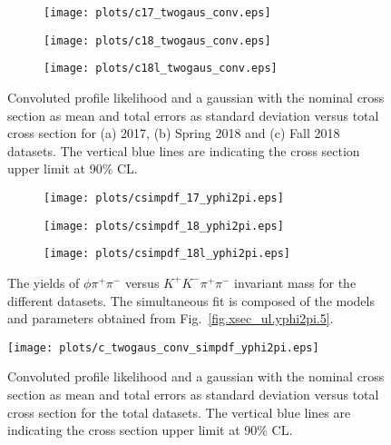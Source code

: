\begin{figure}[htbp]
    \centering
    \begin{subfigure}[b]{0.49\textwidth}
        \texttt{[image: plots/c17\_twogaus\_conv.eps]}
        \caption{}
        \label{fig.xsec_ul.yphi2pi.7.a}
    \end{subfigure}
    \begin{subfigure}[b]{0.49\textwidth}
        \texttt{[image: plots/c18\_twogaus\_conv.eps]}
        \caption{}
        \label{fig.xsec_ul.yphi2pi.7.b}
    \end{subfigure}
    \begin{subfigure}[b]{0.49\textwidth}
        \texttt{[image: plots/c18l\_twogaus\_conv.eps]}
        \caption{}
        \label{fig.xsec_ul.yphi2pi.7.c}
    \end{subfigure}
    \caption{Convoluted profile likelihood and a gaussian with the nominal cross section as mean and total errors as standard deviation versus total cross section for (a) 2017, (b) Spring 2018 and (c) Fall 2018 datasets. The vertical blue lines are indicating the cross section upper limit at 90$\%$ CL.}
    \label{fig.xsec_ul.yphi2pi.7}
\end{figure}

\begin{figure}[htbp]
    \centering
    \begin{subfigure}[b]{0.49\textwidth}
        \texttt{[image: plots/csimpdf\_17\_yphi2pi.eps]}
        \caption{}
        \label{fig.xsec_ul.yphi2pi.8.a}
    \end{subfigure}
    \begin{subfigure}[b]{0.49\textwidth}
        \texttt{[image: plots/csimpdf\_18\_yphi2pi.eps]}
        \caption{}
        \label{fig.xsec_ul.yphi2pi.8.b}
    \end{subfigure}
    \begin{subfigure}[b]{0.49\textwidth}
        \texttt{[image: plots/csimpdf\_18l\_yphi2pi.eps]}
        \caption{}
        \label{fig.xsec_ul.yphi2pi.8.c}
    \end{subfigure}
    \caption{\label{fig.xsec_ul.yphi2pi.8}The yields of $\phi \pi^+ \pi^-$ versus $K^{+}K^{-} \pi^+ \pi^-$ invariant mass for the different datasets. The simultaneous fit is composed of the models and parameters obtained from Fig.~\ref{fig.xsec_ul.yphi2pi.5}.}
\end{figure}

\begin{figure}[H]
    \centering
    \texttt{[image: plots/c\_twogaus\_conv\_simpdf\_yphi2pi.eps]}
    \caption{\label{fig.xsec_ul.yphi2pi.9}Convoluted profile likelihood and a gaussian with the nominal cross section as mean and total errors as standard deviation versus total cross section for the total datasets. The vertical blue lines are indicating the cross section upper limit at 90$\%$ CL.}
\end{figure}

